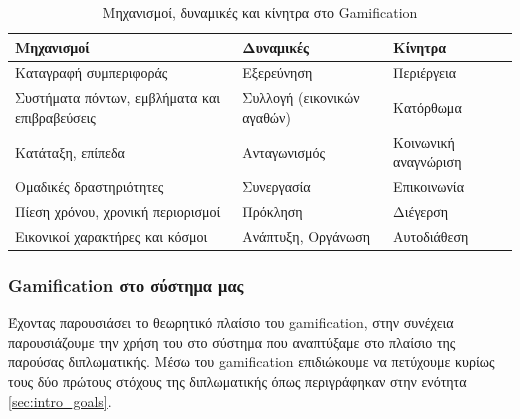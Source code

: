 	\begin{table}[H]
		\begin{center}
		    \begin{tabular}{|l|l|l|}
		    \hline
		    \rowcolor{grayy}
		    \textbf{Μηχανισμοί} & \textbf{Δυναμικές} & \textbf{Κίνητρα}
		    \\ \hline
		     Καταγραφή συμπεριφοράς & Εξερεύνηση & Περιέργεια   
		     \\ \hline
		     Συστήματα πόντων, εμβλήματα και επιβραβεύσεις & Συλλογή (εικονικών αγαθών) & Κατόρθωμα
		     \\ \hline
		     Κατάταξη, επίπεδα & Ανταγωνισμός & Κοινωνική αναγνώριση
		     \\ \hline
		     Ομαδικές δραστηριότητες & Συνεργασία & Επικοινωνία
		     \\ \hline
		     Πίεση χρόνου, χρονική περιορισμοί & Πρόκληση & Διέγερση
		     \\ \hline
		     Εικονικοί χαρακτήρες και κόσμοι & Ανάπτυξη, Οργάνωση & Αυτοδιάθεση
		     \\ \hline
		    \end{tabular}
		    \caption{Μηχανισμοί, δυναμικές και κίνητρα στο Gamification}
			\label{tab:gamifaction_dynamics}
		\end{center}
	\end{table}
	
	\subsubsection{Gamification στο σύστημα μας}
		Έχοντας παρουσιάσει το θεωρητικό πλαίσιο του gamification, στην συνέχεια παρουσιάζουμε την χρήση του στο σύστημα που αναπτύξαμε στο πλαίσιο της παρούσας διπλωματικής. Μέσω του gamification επιδιώκουμε να πετύχουμε κυρίως τους δύο πρώτους στόχους της διπλωματικής όπως περιγράφηκαν στην ενότητα \ref{sec:intro_goals}.
		
